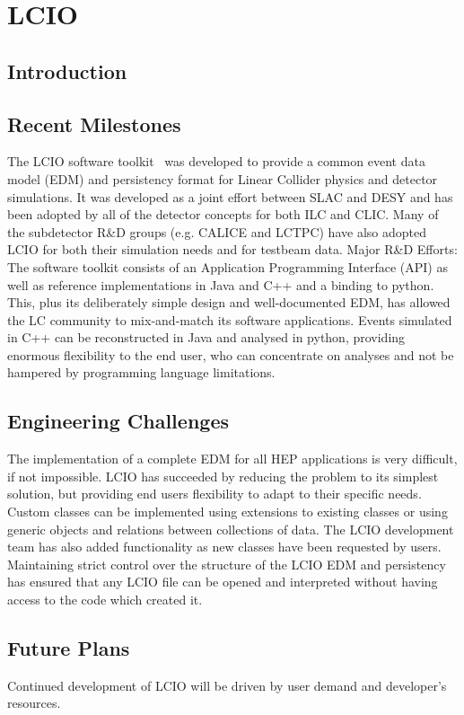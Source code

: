 \section{LCIO}

\subsection{Introduction}

\subsection{Recent Milestones}
The LCIO software toolkit~\cite{lcioWebsite} was developed to provide a common event data model
(EDM) and persistency format for Linear Collider physics and detector
simulations. It was developed as a joint effort between SLAC and DESY and has
been adopted by all of the detector concepts for both ILC and CLIC. Many of
the subdetector R\&D groups (e.g. CALICE and LCTPC) have also adopted LCIO for
both their simulation needs and for testbeam data. Major R\&D Efforts: The
software toolkit consists of an Application Programming Interface (API) as well
as reference implementations in Java and C++ and a binding to python. This, plus
its deliberately simple design and well-documented EDM, has allowed the LC
community to mix-and-match its software applications. Events simulated in C++
can be reconstructed in Java and analysed in python, providing enormous
flexibility to the end user, who can concentrate on analyses and not be hampered
by programming language limitations.

\subsection{Engineering Challenges}
The implementation of a complete EDM for all HEP applications is very difficult,
if not impossible. LCIO has succeeded by reducing the problem to its simplest
solution, but providing end users flexibility to adapt to their specific needs.
Custom classes can be implemented using extensions to existing classes or using
generic objects and relations between collections of data. The LCIO development
team has also added functionality as new classes have been requested by users.
Maintaining strict control over the structure of the LCIO EDM and persistency
has ensured that any LCIO file can be opened and interpreted without having
access to the code which created it.

\subsection{Future Plans}
Continued development of LCIO will be driven by user demand and developer's resources.


